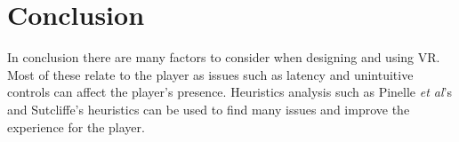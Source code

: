 \documentclass{scrartcl}
\begin{document}
\section{Conclusion}
In conclusion there are many factors to consider when designing and using VR. Most of these relate to the player as issues such as latency and unintuitive controls can affect the player's presence.   Heuristics analysis such as Pinelle \textit{et al}'s and Sutcliffe's heuristics can be used to find many issues and improve the experience for the player.
	


	
\end{document}
